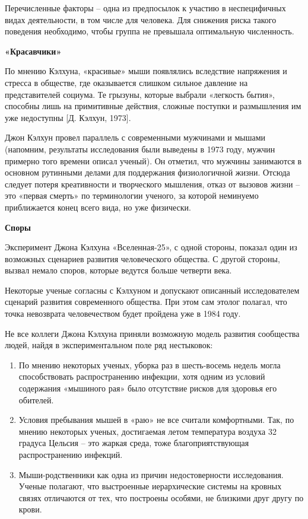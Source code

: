 Перечисленные факторы – одна из предпосылок к участию в неспецифичных видах деятельности, в том числе для человека. Для снижения риска такого поведения необходимо, чтобы группа не превышала оптимальную численность.

\textbf{«Красавчики»}

По мнению Кэлхуна, «красивые» мыши появлялись вследствие напряжения и стресса в обществе, где оказывается слишком сильное давление на представителей социума. Те грызуны, которые выбрали «легкость бытия», способны лишь на примитивные действия, сложные поступки и размышления им уже недоступны [Д.  Кэлхун, 1973].

Джон Кэлхун провел параллель с современными мужчинами и мышами (напомним, результаты исследования были выведены в 1973 году, мужчин примерно того времени описал ученый). Он отметил, что мужчины занимаются в основном рутинными делами для поддержания физиологичной жизни. Отсюда следует потеря креативности и творческого мышления, отказ от вызовов жизни – это «первая смерть» по терминологии ученого, за которой неминуемо приближается конец всего вида, но уже физически.

\textbf{Споры}

Эксперимент Джона Кэлхуна «Вселенная-25», с одной стороны, показал один из возможных сценариев развития человеческого общества. С другой стороны, вызвал немало споров, которые ведутся больше четверти века.

Некоторые ученые согласны с Кэлхуном и допускают описанный исследователем сценарий развития современного общества. При этом сам этолог полагал, что точка невозврата человечеством будет пройдена уже в 1984 году.

Не все коллеги Джона Кэлхуна приняли возможную модель развития сообщества людей, найдя в экспериментальном поле ряд нестыковок:


\begin{enumerate}
    \item По мнению некоторых ученых, уборка раз в шесть-восемь недель могла способствовать распространению инфекции, хотя одним из условий содержания «мышиного рая» было отсутствие рисков для здоровья его обителей.
    \item Условия пребывания мышей в «раю» не все считали комфортными. Так, по мнению некоторых ученых, достигаемая летом температура воздуха 32 градуса Цельсия – это жаркая среда, тоже благоприятствующая распространению инфекций.
    \item Мыши-родственники как одна из причин недостоверности исследования. Ученые полагают, что выстроенные иерархические системы на кровных связях отличаются от тех, что построены особями, не близкими друг другу по крови.
\end{enumerate}

